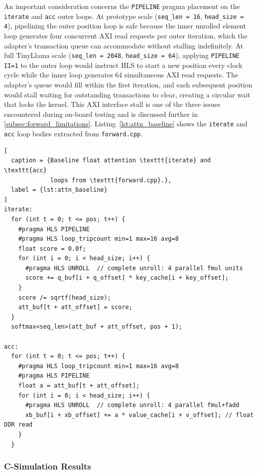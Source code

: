 An important consideration concerns the \texttt{PIPELINE} pragma
placement on the \texttt{iterate} and \texttt{acc} outer loops. At
prototype scale (\texttt{seq\_len = 16}, \texttt{head\_size = 4}),
pipelining the outer position loop is safe because the inner unrolled element
loop generates four concurrent AXI read requests per outer iteration,
which the adapter's transaction queue can accommodate without
stalling indefinitely. At full TinyLlama scale (\texttt{seq\_len =
2048}, \texttt{head\_size = 64}), applying \texttt{PIPELINE II=1} to
the outer loop would instruct HLS to start a new position every clock
cycle while the inner loop generates 64 simultaneous AXI read requests.
The adapter's queue would fill within the first iteration, and each
subsequent position would stall waiting for outstanding transactions to
clear, creating a circular wait that locks the kernel. This AXI
interface stall is one of the three issues encountered during
on-board testing and is discussed further in
\cref{subsec:forward_limitations}.
Listing~\ref{lst:attn_baseline} shows the \texttt{iterate} and
\texttt{acc} loop bodies extracted from \texttt{forward.cpp}.

\begin{lstlisting}[
  caption = {Baseline float attention \texttt{iterate} and \texttt{acc}
             loops from \texttt{forward.cpp}.},
  label = {lst:attn_baseline}
]
iterate:
  for (int t = 0; t <= pos; t++) {
    #pragma HLS PIPELINE
    #pragma HLS loop_tripcount min=1 max=16 avg=8
    float score = 0.0f;
    for (int i = 0; i < head_size; i++) {
      #pragma HLS UNROLL  // complete unroll: 4 parallel fmul units
      score += q_buf[i + q_offset] * key_cache[i + key_offset];
    }
    score /= sqrtf(head_size);
    att_buf[t + att_offset] = score;
  }
  softmax<seq_len>(att_buf + att_offset, pos + 1);

acc:
  for (int t = 0; t <= pos; t++) {
    #pragma HLS loop_tripcount min=1 max=16 avg=8
    #pragma HLS PIPELINE
    float a = att_buf[t + att_offset];
    for (int i = 0; i < head_size; i++) {
      #pragma HLS UNROLL  // complete unroll: 4 parallel fmul+fadd
      xb_buf[i + xb_offset] += a * value_cache[i + v_offset]; // float DDR read
    }
  }
\end{lstlisting}

\subsubsection{C-Simulation Results}
\label{subsubsec:attn_fp32_csim}

